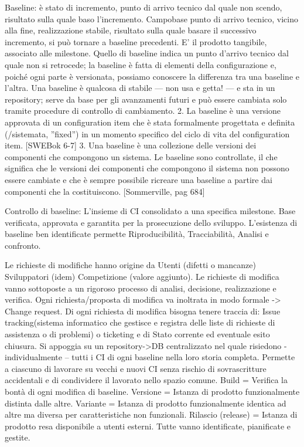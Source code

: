 \documentclass{report}
\begin{document}
Baseline:  è stato di incremento, punto di arrivo tecnico dal quale non scendo, risultato sulla quale baso l'incremento. Campobase punto di arrivo tecnico, vicino alla fine, realizzazione stabile, risultato sulla quale basare il successivo incremento, si può tornare a baseline precedenti. E' il prodotto tangibile, associato alle milestone.
Quello di baseline indica un punto d’arrivo tecnico dal quale non si retrocede; la baseline è fatta di elementi della configurazione e, poiché ogni parte è versionata, possiamo conoscere la differenza tra una baseline e l’altra. Una baseline è qualcosa di stabile — non usa e getta! — e sta in un repository; serve da base per gli avanzamenti futuri e può essere cambiata solo tramite procedure di controllo di cambiamento.
2. La baseline è una versione approvata di un configuration item che è stata formalmente progettata e definita (/sistemata, ”fixed”) in un momento specifico del ciclo di vita del configuration item. [SWEBok 6-7]
3. Una baseline è una collezione delle versioni dei componenti che compongono un sistema. Le baseline sono controllate, il che significa che le versioni dei componenti che compongono il sistema non possono essere cambiate e che è sempre possibile ricreare una baseline a partire dai componenti che la costituiscono. [Sommerville, pag 684]

Controllo di baseline: L’insieme di CI consolidato a una specifica milestone.
Base verificata, approvata e garantita per la prosecuzione dello sviluppo.
L’esistenza di baseline ben identificate permette Riproducibilità, Tracciabilità, Analisi e confronto.

Le richieste di modifiche hanno origine da Utenti (difetti o mancanze) Sviluppatori (idem) Competizione (valore aggiunto).
Le richieste di modifica vanno sottoposte a un rigoroso processo di analisi, decisione, realizzazione e verifica.
Ogni richiesta/proposta di modifica va inoltrata in modo formale -> Change request.
Di ogni richiesta di modifica bisogna tenere traccia di: Issue tracking(sistema informatico che gestisce e registra delle liste di richieste di assistenza o di problemi) o ticketing e di Stato corrente ed eventuale esito chiusura.
Si appoggia su un repository->DB centralizzato nel quale risiedono - individualmente – tutti i CI di ogni baseline nella loro storia completa. Permette a ciascuno di lavorare su vecchi e nuovi CI senza rischio di sovrascritture accidentali e di condividere il lavorato nello spazio comune.
Build = Verifica la bontà di ogni modifica di baseline.
Versione = Istanza di prodotto funzionalmente distinta dalle altre.
Variante = Istanza di prodotto funzionalmente identica ad altre ma diversa per caratteristiche non funzionali.
Rilascio (release) = Istanza di prodotto resa disponibile a utenti esterni.
Tutte vanno identificate, pianificate e gestite.
\end{document}
